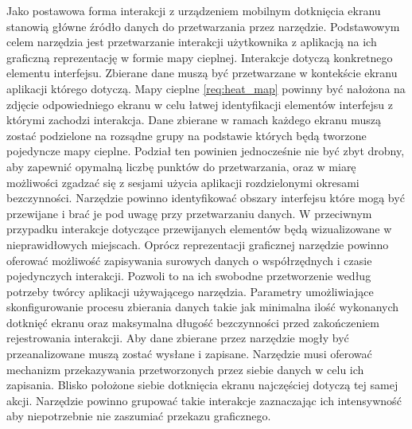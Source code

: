 \begin{enumerate}[label=\textbf{F.\arabic*}]
	 Jako postawowa forma interakcji z urządzeniem mobilnym dotknięcia ekranu stanowią główne źródło danych do przetwarzania przez narzędzie.
	 Podstawowym celem narzędzia jest przetwarzanie interakcji użytkownika z aplikacją na ich graficzną reprezentację w formie mapy cieplnej. 
	 Interakcje dotyczą konkretnego elementu interfejsu. Zbierane dane muszą być przetwarzane w kontekście ekranu aplikacji którego dotyczą. Mapy cieplne \ref{req:heat_map} powinny być nałożona na zdjęcie odpowiedniego ekranu w celu łatwej identyfikacji elementów interfejsu z którymi zachodzi interakcja.
	 Dane zbierane w ramach każdego ekranu muszą zostać podzielone na rozsądne grupy na podstawie których będą tworzone pojedyncze mapy cieplne. Podział ten powinien jednocześnie nie być zbyt drobny, aby zapewnić opymalną liczbę punktów do przetwarzania, oraz w miarę możliwości zgadzać się z sesjami użycia aplikacji rozdzielonymi okresami bezczynności.
	 Narzędzie powinno identyfikować obszary interfejsu które mogą być przewijane i brać je pod uwagę przy przetwarzaniu danych. W przeciwnym przypadku interakcje dotyczące przewijanych elementów będą wizualizowane w nieprawidłowych miejscach.
	 Oprócz reprezentacji graficznej narzędzie powinno oferować możliwość zapisywania surowych danych o współrzędnych i czasie pojedynczych interakcji. Pozwoli to na ich swobodne przetworzenie według potrzeby twórcy aplikacji używającego narzędzia.
	 Parametry umożliwiające skonfigurowanie procesu zbierania danych takie jak minimalna ilość wykonanych dotknięć ekranu oraz maksymalna długość bezczynności przed zakończeniem rejestrowania interakcji.
	 Aby dane zbierane przez narzędzie mogły być przeanalizowane muszą zostać wysłane i zapisane. Narzędzie musi oferować mechanizm przekazywania przetworzonych przez siebie danych w celu ich zapisania.
	 Blisko położone siebie dotknięcia ekranu najczęściej dotyczą tej samej akcji. Narzędzie powinno grupować takie interakcje zaznaczając ich intensywność aby niepotrzebnie nie zaszumiać przekazu graficznego.

\end{enumerate}
